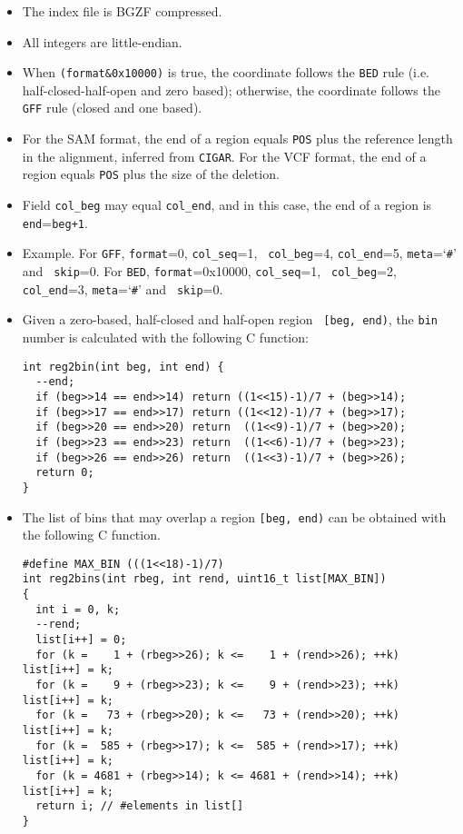 \documentclass[10pt]{article}
\begin{document}
\begin{itemize}
\item The index file is BGZF compressed.
\item All integers are little-endian.
\item When {\tt (format\&0x10000)} is true, the coordinate follows the
  {\tt BED} rule (i.e. half-closed-half-open and zero based); otherwise,
  the coordinate follows the {\tt GFF} rule (closed and one based).
\item For the SAM format, the end of a region equals {\tt POS} plus the
  reference length in the alignment, inferred from {\tt CIGAR}. For the
  VCF format, the end of a region equals {\tt POS} plus the size of the
  deletion.
\item Field {\tt col\_beg} may equal {\tt col\_end}, and in this case,
  the end of a region is {\tt end}={\tt beg+1}.
\item Example. For {\tt GFF}, {\tt format}=0, {\tt col\_seq}=1, {\tt
    col\_beg}=4, {\tt col\_end}=5, {\tt meta}=`{\tt \#}' and {\tt
    skip}=0. For {\tt BED}, {\tt format}=0x10000, {\tt col\_seq}=1, {\tt
    col\_beg}=2, {\tt col\_end}=3, {\tt meta}=`{\tt \#}' and {\tt
    skip}=0.
\item Given a zero-based, half-closed and half-open region {\tt
  [beg,\,end)}, the {\tt bin} number is calculated with the following C
  function:
\begin{verbatim}
int reg2bin(int beg, int end) {
  --end;
  if (beg>>14 == end>>14) return ((1<<15)-1)/7 + (beg>>14);
  if (beg>>17 == end>>17) return ((1<<12)-1)/7 + (beg>>17);
  if (beg>>20 == end>>20) return  ((1<<9)-1)/7 + (beg>>20);
  if (beg>>23 == end>>23) return  ((1<<6)-1)/7 + (beg>>23);
  if (beg>>26 == end>>26) return  ((1<<3)-1)/7 + (beg>>26);
  return 0;
}
\end{verbatim}
\item The list of bins that may overlap a region {\tt [beg,\,end)} can be
  obtained with the following C function.
\begin{verbatim}
#define MAX_BIN (((1<<18)-1)/7)
int reg2bins(int rbeg, int rend, uint16_t list[MAX_BIN])
{
  int i = 0, k;
  --rend;
  list[i++] = 0;
  for (k =    1 + (rbeg>>26); k <=    1 + (rend>>26); ++k) list[i++] = k;
  for (k =    9 + (rbeg>>23); k <=    9 + (rend>>23); ++k) list[i++] = k;
  for (k =   73 + (rbeg>>20); k <=   73 + (rend>>20); ++k) list[i++] = k;
  for (k =  585 + (rbeg>>17); k <=  585 + (rend>>17); ++k) list[i++] = k;
  for (k = 4681 + (rbeg>>14); k <= 4681 + (rend>>14); ++k) list[i++] = k;
  return i; // #elements in list[]
}
\end{verbatim}
\end{itemize}
\end{document}
